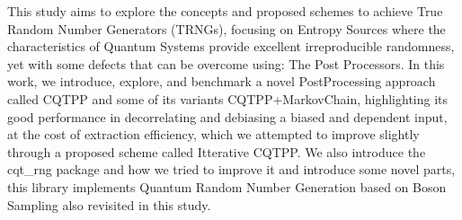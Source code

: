 This study aims to explore the concepts and proposed schemes to achieve True Random Number Generators (TRNGs), focusing on Entropy Sources where the characteristics of Quantum Systems provide excellent irreproducible randomness, yet with some defects that can be overcome using: The Post Processors. 
In this work, we introduce, explore, and benchmark a novel PostProcessing approach called CQTPP and some of its variants CQTPP+MarkovChain, highlighting its good performance in decorrelating and debiasing a biased and dependent input, at the cost of extraction efficiency, which we attempted to improve slightly through a proposed scheme called Itterative CQTPP. We also introduce the cqt\_rng package and how we tried to improve it and introduce some  novel parts, this library implements Quantum Random Number Generation based on Boson Sampling also revisited in this study.